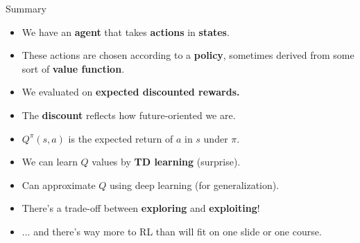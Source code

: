 \documentclass{beamer} %
\begin{document}
\begin{frame}{Summary}
\begin{itemize}
\item We have an \textbf{agent} that takes \textbf{actions} in \textbf{states}. 
\item<2-> These actions are chosen according to a \textbf{policy}, sometimes derived from some sort of \textbf{value function}. 
\item<3-> We evaluated on \textbf{expected discounted rewards.}
\item<4-> The \textbf{discount} reflects how future-oriented we are.
\item<5-> \(Q^\pi(s,a)\) is the expected return of \(a\) in \(s\) under \(\pi\).
\item<6-> We can learn \(Q\) values by \textbf{TD learning} (surprise).
\item<7-> Can approximate \(Q\) using deep learning (for generalization). 
\item<8-> There's a trade-off between \textbf{exploring} and \textbf{exploiting}!
\item<9-> ... and there's way more to RL than will fit on one slide or one course.
\end{itemize}
\end{frame}
\end{document}
